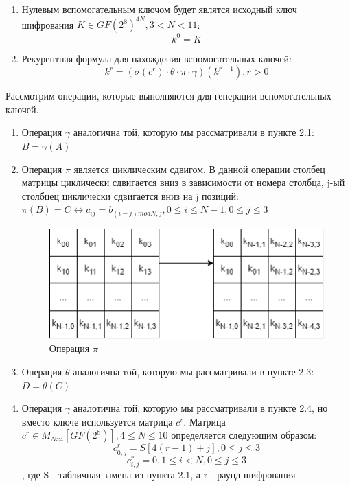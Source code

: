 \documentclass[12pt]{article}
\begin{document}
\begin{enumerate}
    \item Нулевым вспомогательным ключом будет являтся исходный ключ шифрования $K \in GF(2^{8})^{4N}, 3 < N < 11$:
    \[k^{0} = K \]
    \item Рекурентная формула для нахождения вспомогательных ключей: 
    \[k^{r} = (\sigma(c^{r}) \cdot \theta \cdot \pi \cdot \gamma)(k^{r-1}), r > 0 \]
\end{enumerate}
\newline
Рассмотрим операции, которые выполняются для генерации вспомогательных ключей.
\begin{enumerate}
    \item Операция $\gamma$ аналогична той, которую мы рассматривали в пункте 2.1: $B = \gamma(A)$
    \item Операция $\pi$ является циклическим сдвигом. В данной операции столбец матрицы циклически сдвигается вниз в зависимости от номера столбца, j-ый столбцец циклически сдвигается вниз на j позиций: $\pi(B) = C \leftrightarrow c_{ij} = b_{(i-j)modN, j}, 0 \leq i \leq N - 1, 0 \leq j \leq 3$
    
    \begin{figure}[h]
        \centering
        \includegraphics[width=0.4\linewidth]{operation_pi.png}
        \caption{Операция $\pi$}
        \label{fig:scheme}
    \end{figure}
    
    \item Операция $\theta$ аналогична той, которую мы рассматривали в пункте 2.3: $D = \theta(C)$
    \item Операция $\gamma$ аналотична той, которую мы рассматривали в пункте 2.4, но вместо ключе используется матрица $c^{r}$. Матрица $c^{r} \in M_{Nx4}[GF(2^{8})], 4 \leq N \leq 10$ определяется следующим образом:
\[c^{r}_{0,j} = S[4(r-1) + j], 0 \leq j \leq 3\]
\[c^{r}_{i,j} = 0, 1 \leq i < N, 0 \leq j \leq 3\]
, где S - табличная замена из пункта 2.1, а r - раунд шифрования

\end{enumerate}
\end{document}

